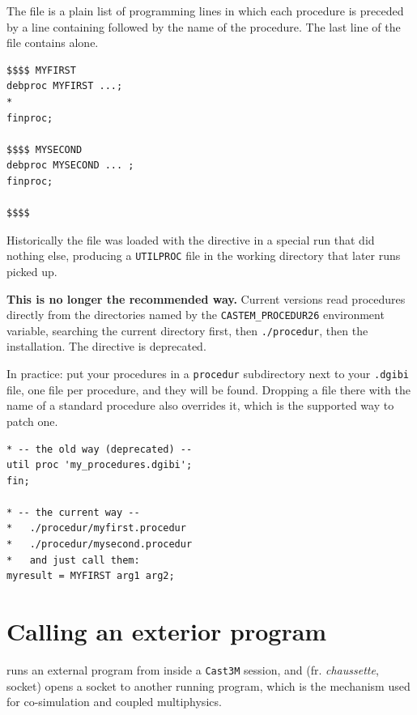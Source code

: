 \begin{castemcom}
The file is a plain list of programming lines in which each procedure is
preceded by a line containing \op{\$\$\$\$} followed by the name of the
procedure. The last line of the file contains \op{\$\$\$\$} alone.
\end{castemcom}
\begin{castemlines}
\begin{verbatim}
$$$$ MYFIRST
debproc MYFIRST ...;
*
finproc;

$$$$ MYSECOND
debproc MYSECOND ... ;
finproc;

$$$$
\end{verbatim}
\end{castemlines}

\begin{castemcom}
Historically the file was loaded with the  directive in a special
run that did nothing else, producing a \texttt{UTILPROC} file in the working
directory that later runs picked up.

\medskip
\textbf{This is no longer the recommended way.} Current versions read
procedures directly from the directories named by the
\texttt{CASTEM\_PROCEDUR26} environment variable, searching the current
directory first, then \texttt{./procedur}, then the installation. The
 directive is deprecated.

In practice: put your procedures in a \texttt{procedur} subdirectory next to
your \texttt{.dgibi} file, one file per procedure, and they will be found.
Dropping a file there with the name of a standard procedure also overrides
it, which is the supported way to patch one.
\end{castemcom}
\begin{castemlines}
\begin{verbatim}
* -- the old way (deprecated) --
util proc 'my_procedures.dgibi';
fin;

* -- the current way --
*   ./procedur/myfirst.procedur
*   ./procedur/mysecond.procedur
*   and just call them:
myresult = MYFIRST arg1 arg2;
\end{verbatim}
\end{castemlines}

\section{Calling an exterior program}

  runs an
external program from inside a \texttt{Cast3M} session, and
 
(fr. \emph{chaussette}, socket) opens a socket to another running program,
which is the mechanism used for co-simulation and coupled multiphysics.

